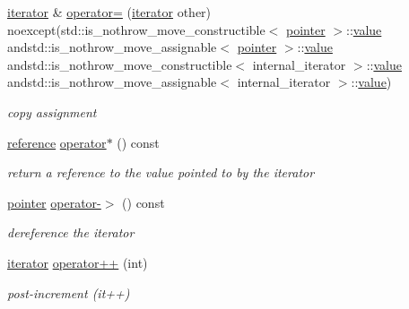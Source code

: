 \begin{DoxyCompactItemize}
\hyperlink{classnlohmann_1_1basic__json_1_1iterator}{iterator} \& \hyperlink{classnlohmann_1_1basic__json_1_1iterator_a28e1e3ea6f52ab57f1a2fd98f6ab5d9c}{operator=} (\hyperlink{classnlohmann_1_1basic__json_1_1iterator}{iterator} other) noexcept(std\-::is\-\_\-nothrow\-\_\-move\-\_\-constructible$<$ \hyperlink{classnlohmann_1_1basic__json_1_1const__iterator_a1da96fc3054d547e7706d3a2f073f389}{pointer} $>$\-::\hyperlink{classnlohmann_1_1basic__json_1_1iterator_a8ffbf287736048e683f58306fdb8701f}{value} andstd\-::is\-\_\-nothrow\-\_\-move\-\_\-assignable$<$ \hyperlink{classnlohmann_1_1basic__json_1_1const__iterator_a1da96fc3054d547e7706d3a2f073f389}{pointer} $>$\-::\hyperlink{classnlohmann_1_1basic__json_1_1iterator_a8ffbf287736048e683f58306fdb8701f}{value} andstd\-::is\-\_\-nothrow\-\_\-move\-\_\-constructible$<$ internal\-\_\-iterator $>$\-::\hyperlink{classnlohmann_1_1basic__json_1_1iterator_a8ffbf287736048e683f58306fdb8701f}{value} andstd\-::is\-\_\-nothrow\-\_\-move\-\_\-assignable$<$ internal\-\_\-iterator $>$\-::\hyperlink{classnlohmann_1_1basic__json_1_1iterator_a8ffbf287736048e683f58306fdb8701f}{value})
\begin{DoxyCompactList}\small\item\em copy assignment \end{DoxyCompactList}\item 
\hyperlink{classnlohmann_1_1basic__json_1_1const__iterator_aefd248cac6493eed1e6ff53ba6a63eb2}{reference} \hyperlink{classnlohmann_1_1basic__json_1_1iterator_acbd82115f9232c3d3b5dacc78315b9da}{operator$\ast$} () const 
\begin{DoxyCompactList}\small\item\em return a reference to the value pointed to by the iterator \end{DoxyCompactList}\item 
\hyperlink{classnlohmann_1_1basic__json_1_1const__iterator_a1da96fc3054d547e7706d3a2f073f389}{pointer} \hyperlink{classnlohmann_1_1basic__json_1_1iterator_a8de46badb5b2177c85c672a71bcca017}{operator-\/$>$} () const 
\begin{DoxyCompactList}\small\item\em dereference the iterator \end{DoxyCompactList}\item 
\hyperlink{classnlohmann_1_1basic__json_1_1iterator}{iterator} \hyperlink{classnlohmann_1_1basic__json_1_1iterator_a2943e49b3d88e6ee5793c5923ab2ede9}{operator++} (int)
\begin{DoxyCompactList}\small\item\em post-\/increment (it++) \end{DoxyCompactList}\item 

\end{DoxyCompactItemize}
